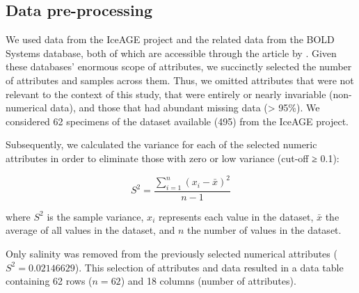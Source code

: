 \subsection{Data pre-processing}
We used data from the IceAGE project and the related data from the BOLD Systems database, both of which are accessible through the article by \citep{uhlir_adding_2021}. Given these databases’ enormous scope of attributes, we succinctly selected the number of attributes and samples across them. Thus, we omitted attributes that were not relevant to the context of this study, that were entirely or nearly invariable (non-numerical data), and those that had abundant missing data (> 95\%). We considered 62 specimens of the dataset available (495) from the IceAGE project.

Subsequently, we calculated the variance for each of the selected numeric attributes in order to eliminate those with zero or low variance (cut-off ≥ 0.1):

\begin{equation}
    S^2 = \frac{\sum_{i=1}^{n} (x_i - \bar{x})^2}{n-1}
\end{equation}

where $S^2$ is the sample variance, $x_i$ represents each value in the dataset, $\bar{x}$ the average of all values in the dataset, and $n$ the number of values in the dataset.

Only salinity was removed from the previously selected numerical attributes ($S^2 = 0.02146629$). This selection of attributes and data resulted in a data table containing 62 rows ($n=62$) and 18 columns (number of attributes). 

